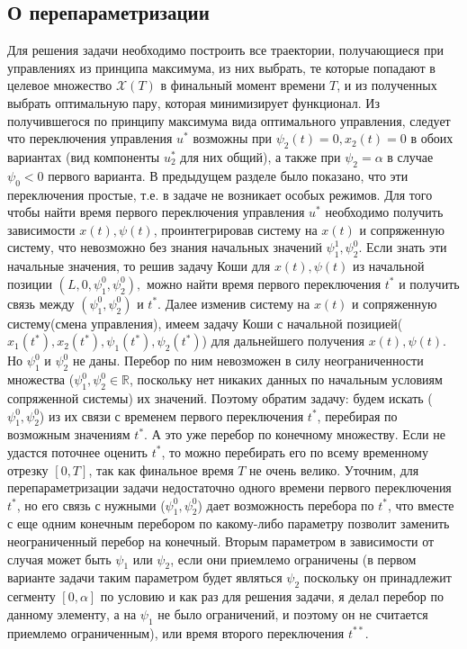 \documentclass[11pt]{article}
\begin{document}
	\subsection{О перепараметризации}
	{Для решения задачи необходимо построить все траектории, получающиеся при управлениях из принципа максимума, из них выбрать, те которые попадают в целевое множество $\mathcal{X}(T)$ в финальный момент времени $T$, и из полученных выбрать оптимальную пару, которая минимизирует функционал.
	\newline
	 Из получившегося по принципу максимума вида оптимального управления, следует что переключения управления $u^*$ возможны при $\psi_2(t) = 0, x_2(t) = 0$ в обоих вариантах (вид компоненты $u_2^*$ для них общий), а также при $\psi_2 = \alpha$ в случае $\psi_0 < 0$ первого варианта. В предыдущем разделе было показано, что эти переключения простые, т.е. в задаче не возникает особых режимов.
	 \newline
	 Для того чтобы найти время первого переключения управления $u^*$ необходимо получить зависимости $x(t),  \psi(t)$, проинтегрировав систему на $x(t)$ и сопряженную систему, что невозможно без знания начальных значений $\psi_1^1,\psi_2^0$. Если знать эти начальные значения, то решив задачу Коши для $x(t),\psi(t) $ из начальной позиции $(L,0,\psi_1^0,\psi_2^0),$ можно найти время первого переключения $t^*$ и получить связь между $(\psi_1^0,\psi_2^0)$ и $t^*$. Далее изменив систему на $x(t)$ и сопряженную систему(смена управления), имеем задачу Коши с начальной позицией($x_1(t^*),x_2(t^*),\psi_1(t^*),\psi_2(t^*)$) для дальнейшего получения $x(t), \psi(t)$.
	 \newline
	 Но $\psi_1^0$ и $\psi_2^0$	не даны. Перебор по ним невозможен в силу неограниченности множества ($\psi_1^0,\psi_2^0 \in \mathbb{R}$, поскольку нет никаких данных по начальным условиям сопряженной системы) их значений. Поэтому обратим задачу: будем искать ($\psi_1^0,\psi_2^0$) из их связи с временем первого переключения $t^*$, перебирая по возможным значениям $t^*$. А это уже перебор по конечному множеству. Если не удастся поточнее оценить $t^*$, то можно перебирать его по всему временному отрезку $[0, T]$, так как финальное время $T$ не очень велико.
	 \newline
	 Уточним, для перепараметризации задачи недостаточно одного времени первого переключения $t^*$, но его связь с нужными ($\psi_1^0,\psi_2^0$) дает возможность перебора по $t^*$, что вместе с еще одним конечным перебором по какому-либо параметру позволит заменить неограниченный перебор на конечный. Вторым параметром в зависимости от случая может быть $\psi_1$ или $\psi_2$, если они приемлемо ограничены (в первом варианте задачи таким параметром будет являться $\psi_2$ поскольку он принадлежит сегменту $[0,\alpha]$ по условию и как раз для решения задачи, я делал перебор по данному элементу, а на $\psi_1$ не было ограничений, и поэтому он не считается приемлемо ограниченным), или время второго переключения $t^{**}$.
	 
}
\end{document}
